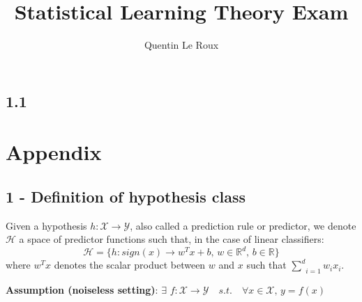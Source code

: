 \documentclass{homework}
\title{Statistical Learning Theory Exam}
\author{Quentin Le Roux}
\begin{document}
\maketitle

\exercise[1: ]

\subsection*{1.1}



\clearpage
\section*{Appendix}
\subsection*{1 - Definition of hypothesis class}
Given a hypothesis $h:\mathcal{X}\rightarrow\mathcal{Y}$, also called a prediction rule or predictor, we denote $\mathcal{H}$ a space of predictor functions such that, in the case of linear classifiers:
$$\mathcal{H}=\{h:sign(x)\rightarrow w^Tx+b,\, w\in\mathbb{R}^d,\, b\in\mathbb{R}\}$$
where $w^Tx$ denotes the scalar product between $w$ and $x$ such that $\underset{i=1}{\overset{d}{\sum}}w_ix_i$.

\textbf{Assumption (noiseless setting)}: $\exists\,\,f:\mathcal{X}\rightarrow\mathcal{Y}\quad{s.t.}\quad\forall x\in \mathcal{X},\,y=f(x)$
\end{document}
